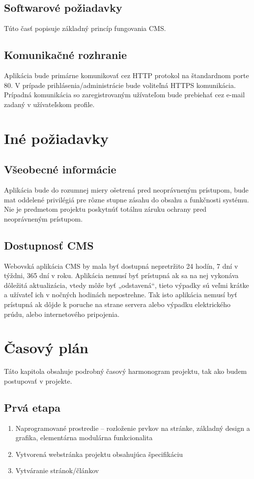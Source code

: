 \documentclass[a4paper,titlepage,11pt]{article}
\begin{document}
\subsection{Softwarové požiadavky}
Túto časť popisuje základný princíp fungovania CMS. 

\subsection{Komunikačné rozhranie}
Aplikácia bude primárne komunikovať cez HTTP protokol na štandardnom porte 80. V prípade prihlásenia\slash administrácie bude voliteľná HTTPS komunikácia. Prípadná komunikácia so zaregistrovaným užívateľom bude prebiehať cez e-mail zadaný v užívateľskom profile.

\newpage
\section{Iné požiadavky}
\subsection{Všeobecné informácie}
Aplikácia bude do rozumnej miery ošetrená pred neoprávneným prístupom, bude mat oddelené privilégiá pre rôzne stupne zásahu do obsahu a funkčnosti systému. Nie je predmetom projektu poskytnúť totálnu záruku ochrany pred neoprávneným prístupom.
 
\subsection{Dostupnosť CMS}
Webovská aplikácia CMS by mala byť dostupná nepretržito 24 hodín, 7 dní v týždni, 365 dní v roku. 
Aplikácia nemusí byť prístupná ak sa na nej vykonáva dôležitá aktualizácia, vtedy môže byť „odstavená“, tieto výpadky sú veľmi krátke a užívateľ ich v nočných hodinách nepostrehne. 
Tak isto aplikácia nemusí byť prístupná ak dôjde k poruche na strane servera alebo výpadku elektrického prúdu, alebo internetového pripojenia.

\newpage
\section{Časový plán}
Táto kapitola obsahuje podrobný časový harmonogram projektu, tak ako budem postupovať v projekte. 

\subsection{Prvá etapa}
\begin{enumerate}
 \item Naprogramované prostredie -- rozloženie prvkov na stránke, základný design a grafika, elementárna modulárna funkcionalita
 \item Vytvorená webstránka projektu obsahujúca špecifikáciu 
 \item Vytváranie stránok\slash článkov
\end{enumerate}
\end{document}
